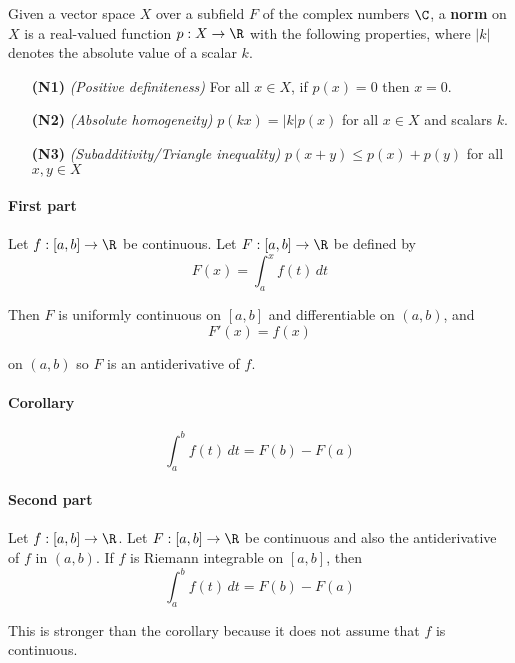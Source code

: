 \label{e0fff96}

Given a vector space $X$ over a subfield $F$ of the complex numbers
$\C$, a \textbf{norm} on $X$ is a real-valued function $p:X\to\R$ with
the following properties, where $|k|$ denotes the absolute value of a
scalar $k$.
\begin{enumerate}
	\item [\textbf{(N1)}] \textit{(Positive definiteness)} For all $x\in
		      X$, if $p(x)=0$ then $x=0$.
	\item [\textbf{(N2)}] \textit{(Absolute homogeneity)}
	      $p(kx)=|k|p(x)$ for all $x\in X$ and scalars $k$.
	\item [\textbf{(N3)}] \textit{(Subadditivity/Triangle inequality)}
	      $p(x+y)\leq p(x)+p(y)$ for all $x,y\in X$
\end{enumerate}


\label{b869dc0}

\paragraph{First part} Let $f:[a,b]\to\R$ be continuous. Let
$F:[a,b]\to\R$ be defined by
$$F(x)=\int_a^xf(t)\,dt$$

Then $F$ is uniformly continuous on $[a,b]$ and differentiable on
$(a,b)$, and
$$F'(x)=f(x)$$

on $(a,b)$ so $F$ is an antiderivative of $f$.

\paragraph{Corollary}
$$\int_a^bf(t)\,dt=F(b)-F(a)$$

\paragraph{Second part} Let $f:[a,b]\to\R$. Let $F:[a,b]\to\R$ be
continuous and also the antiderivative of $f$ in $(a,b)$. If $f$ is
Riemann integrable on $[a,b]$, then
$$\int_a^bf(t)\,dt=F(b)-F(a)$$

This is stronger than the corollary because it does not assume that
$f$ is continuous.

